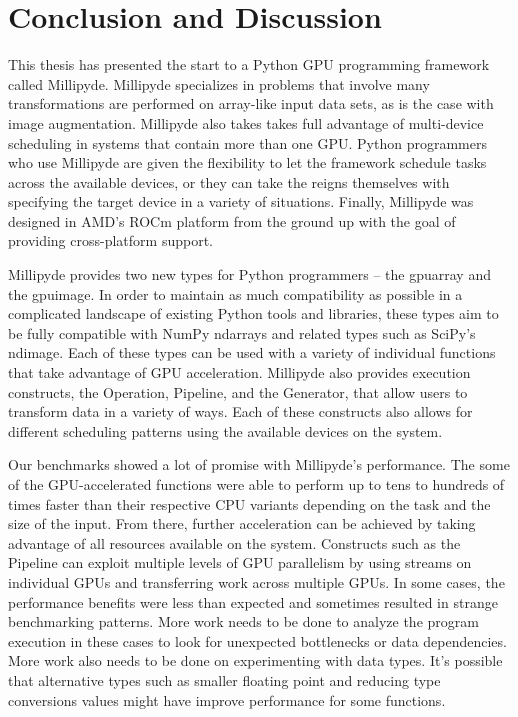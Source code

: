 \chapter{Conclusion and Discussion}

This thesis has presented the start to a Python GPU programming framework called Millipyde. Millipyde specializes in problems that involve many transformations are performed on array-like input data sets, as is the case with image augmentation. Millipyde also takes takes full advantage of multi-device scheduling in systems that contain more than one GPU. Python programmers who use Millipyde are given the flexibility to let the framework schedule tasks across the available devices, or they can take the reigns themselves with specifying the target device in a variety of situations. Finally, Millipyde was designed in AMD's ROCm platform from the ground up with the goal of providing cross-platform support. 

\quad Millipyde provides two new types for Python programmers -- the gpuarray and the gpuimage. In order to maintain as much compatibility as possible in a complicated landscape of existing Python tools and libraries, these types aim to be fully compatible with NumPy ndarrays and related types such as SciPy's ndimage. Each of these types can be used with a variety of individual functions that take advantage of GPU acceleration. Millipyde also provides execution constructs, the Operation, Pipeline, and the Generator, that allow users to transform data in a variety of ways. Each of these constructs also allows for different scheduling patterns using the available devices on the system.

\quad Our benchmarks showed a lot of promise with Millipyde's performance. The some of the GPU-accelerated functions were able to perform up to tens to hundreds of times faster than their respective CPU variants depending on the task and the size of the input. From there, further acceleration can be achieved by taking advantage of all resources available on the system. Constructs such as the Pipeline can exploit multiple levels of GPU parallelism by using streams on individual GPUs and transferring work across multiple GPUs. In some cases, the performance benefits were less than expected and sometimes resulted in strange benchmarking patterns. More work needs to be done to analyze the program execution in these cases to look for unexpected bottlenecks or data dependencies. More work also needs to be done on experimenting with data types. It's possible that alternative types such as smaller floating point and reducing type conversions values might have improve performance for some functions.

